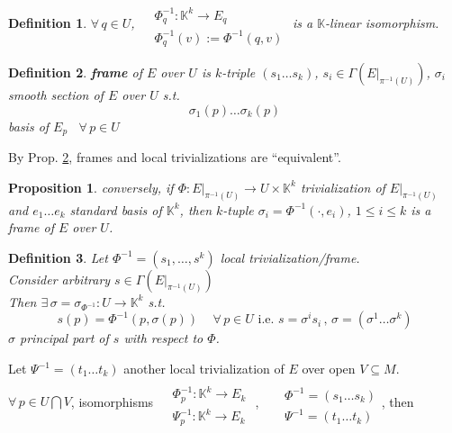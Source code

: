 \documentclass[10pt]{amsart}
\newtheorem{proposition}{Proposition}
\newtheorem{definition}{Definition}
\begin{document}
\begin{multicols*}{2}
\begin{definition}
\phantom{ \quad \, } $\forall \, q \in U$, $\begin{aligned} & \quad \\
  & \Phi_q^{-1}: \mathbb{K}^k \to E_q \\
  & \Phi_q^{-1}(v) := \Phi^{-1}(q,v) \end{aligned}$ is a $\mathbb{K}$-linear isomorphism.
\end{definition}








\begin{definition}\label{Prop:frametrivializequiv}
  \textbf{frame} of $E$ over $U$ is $k$-triple $(s_1 \dots s_k)$, $s_i \in \Gamma(\left. E \right|_{\pi^{-1}(U)} )$, $\sigma_i$ smooth section of $E$ over $U$ s.t. 
\[
\sigma_1(p) \dots \sigma_k(p)
\]
basis of $E_p$ \, $\forall \, p \in U$
\end{definition}

By Prop. \ref{Prop:frametrivializequiv}, frames and local trivializations are ``equivalent''.  




\begin{proposition}





conversely, if $ \Phi : \left. E \right|_{\pi^{-1}(U)} \to U \times \mathbb{K}^k$ trivialization of $\left. E \right|_{\pi^{-1}(U)}$ and $e_1 \dots e_k$ standard basis of $\mathbb{K}^k$, then $k$-tuple $\sigma_i = \Phi^{-1}(\cdot, e_i)$, $1 \leq i \leq k$ is a frame of $E$ over $U$. 
\end{proposition}




\begin{definition}
Let $\Phi^{-1} = (s_1,\dots, s^k)$ local trivialization/frame. \\
Consider arbitrary $s \in \Gamma( \left. E \right|_{\pi^{-1}(U) })$  \\
Then $\exists \, \sigma = \sigma_{\Phi^{-1} }: U \to \mathbb{K}^k$ s.t.
\[
s(p) = \Phi^{-1}(p,\sigma(p)) \quad \, \forall \, p \in U \text{ i.e. } s = \sigma^i s_i \, , \,  \sigma = (\sigma^1 \dots \sigma^k)
\] 
$\sigma$ \emph{principal part of $s$ with respect to $\Phi$}.
\end{definition}

Let $\Psi^{-1} = (t_1 \dots t_k)$ another local trivialization of $E$ over open $V \subseteq M$.  \\
\phantom{Let } $\forall \, p \in U \bigcap V$, isomorphisms $\begin{aligned} & \quad \\
  & \Phi_p^{-1} : \mathbb{K}^k \to E_k \\
  & \Psi_p^{-1} : \mathbb{K}^k \to E_k  \end{aligned}$ , \quad \, $\begin{aligned} & \quad \\
  & \Phi^{-1} = (s_1 \dots s_k) \\
  & \Psi^{-1} = (t_1 \dots t_k) \end{aligned}$, then 


\end{multicols*}
\end{document}
